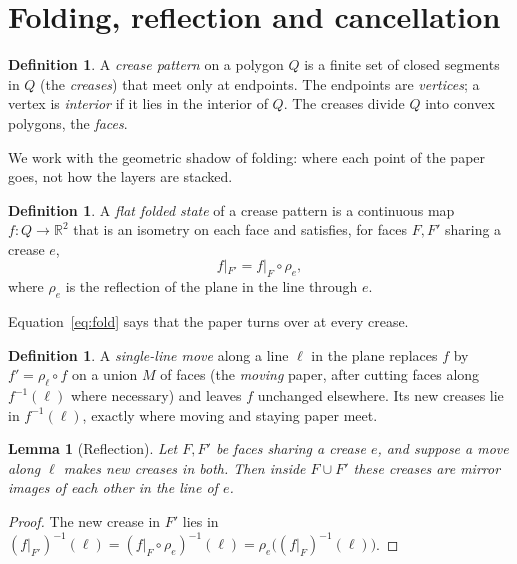 \documentclass[11pt]{article}
\newtheorem{lemma}[theorem]{Lemma}
\theoremstyle{definition}
\newtheorem{definition}[theorem]{Definition}
\theoremstyle{remark}
\newcommand{\R}{\mathbb{R}}
\begin{document}
\section{Folding, reflection and cancellation}\label{sec:folding}

\begin{definition}
A \emph{crease pattern} on a polygon $Q$ is a finite set of closed segments in $Q$ (the \emph{creases}) that meet only at endpoints. The endpoints are \emph{vertices}; a vertex is \emph{interior} if it lies in the interior of $Q$. The creases divide $Q$ into convex polygons, the \emph{faces}.
\end{definition}

We work with the geometric shadow of folding: where each point of the paper goes, not how the layers are stacked.

\begin{definition}
A \emph{flat folded state} of a crease pattern is a continuous map $f\colon Q\to\R^2$ that is an isometry on each face and satisfies, for faces $F,F'$ sharing a crease $e$,
\begin{equation}\label{eq:fold}
f|_{F'} = f|_F\circ\rho_e,
\end{equation}
where $\rho_e$ is the reflection of the plane in the line through $e$.
\end{definition}

Equation~\eqref{eq:fold} says that the paper turns over at every crease.

\begin{definition}
A \emph{single-line move} along a line $\ell$ in the plane replaces $f$ by $f'=\rho_\ell\circ f$ on a union $M$ of faces (the \emph{moving} paper, after cutting faces along $f^{-1}(\ell)$ where necessary) and leaves $f$ unchanged elsewhere. Its new creases lie in $f^{-1}(\ell)$, exactly where moving and staying paper meet.
\end{definition}

\begin{lemma}[Reflection]\label{lem:reflection}
Let $F,F'$ be faces sharing a crease $e$, and suppose a move along $\ell$ makes new creases in both. Then inside $F\cup F'$ these creases are mirror images of each other in the line of $e$.
\end{lemma}

\begin{proof}
The new crease in $F'$ lies in $(f|_{F'})^{-1}(\ell)=(f|_F\circ\rho_e)^{-1}(\ell)=\rho_e\big((f|_F)^{-1}(\ell)\big)$.
\end{proof}
\end{document}
